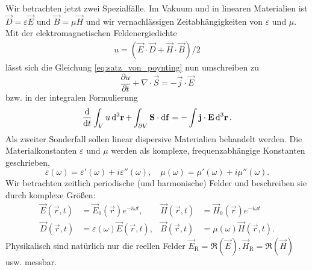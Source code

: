 Wir betrachten jetzt zwei Spezialfälle. Im Vakuum und in linearen Materialien ist $\vec {D}=\varepsilon \vec {E}$ und $\vec {B}=\mu \vec {H}$ und wir vernachlässigen Zeitabhängigkeiten von $\varepsilon $ und $\mu $. Mit der elektromagnetischen Feldenergiedichte
\begin{align}
	\label{eq:energiedichte}
	u=\left(\vec {E}\cdot \vec {D}+\vec {H}\cdot \vec {B}\right)/2
\end{align}
lässt sich die Gleichung \eqref{eq:satz_von_poynting} nun umschreiben zu
\begin{equation*}
	\frac{\partial u}{\partial t}+\nabla \cdot \vec {S}=-\vec {j}\cdot \vec {E}
\end{equation*}
bzw. in der integralen Formulierung
\begin{equation*}
	\frac{\diff }{\diff t}\int _{V}u\diffa[3]{\vec{r}}+\int _{\partial V}\vec {S}\cdot \diff \vec {f}=-\int \vec {j}\cdot \vec {E}\diffa[3]{\vec{r}}.
\end{equation*}
Als zweiter Sonderfall sollen linear dispersive Materialien behandelt werden. Die Materialkonstanten $\varepsilon $ und $\mu $ werden als komplexe, frequenzabhängige Konstanten geschrieben,
\begin{equation*}
	\varepsilon \left(\omega \right)=\varepsilon '\left(\omega \right)+i\varepsilon ''\left(\omega \right),\quad \mu \left(\omega \right)=\mu '\left(\omega \right)+i\mu ''\left(\omega \right).
\end{equation*}
Wir betrachten zeitlich periodische (und harmonische) Felder und beschreiben sie durch komplexe Größen:
\begin{align*}
	\vec {E}\left(\vec {r},t\right) & =\vec {E}_{0}\left(\vec {r}\right)e^{-i\omega t},                 & \vec {H}\left(\vec {r},t\right) & =\vec {H}_{0}\left(\vec {r}\right)e^{-i\omega t}         \\
	\vec {D}\left(\vec {r},t\right) & =\varepsilon \left(\omega \right)\vec {E}\left(\vec {r},t\right), & \vec {B}\left(\vec {r},t\right) & =\mu \left(\omega \right)\vec {H}\left(\vec {r},t\right).
\end{align*}
Physikalisch sind natürlich nur die reellen Felder $\vec {E}_{\mathrm{R}}=\mathfrak{R}\left(\vec {E}\right), \vec {H}_{\mathrm{R}}=\mathfrak{R}\left(\vec {H}\right)$ usw. messbar.

